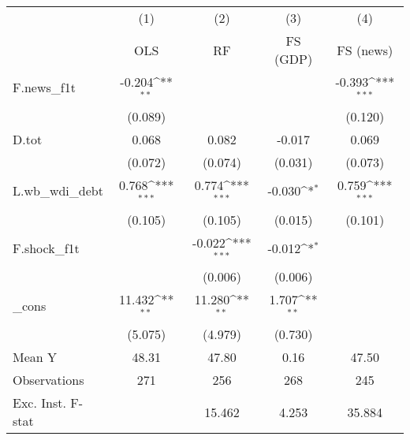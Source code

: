 {
\def\sym#1{\ifmmode^{#1}\else\(^{#1}\)\fi}
\begin{tabular}{l*{4}{c}}
\toprule
            &\multicolumn{1}{c}{(1)}&\multicolumn{1}{c}{(2)}&\multicolumn{1}{c}{(3)}&\multicolumn{1}{c}{(4)}\\
            &\multicolumn{1}{c}{OLS}&\multicolumn{1}{c}{RF}&\multicolumn{1}{c}{FS (GDP)}&\multicolumn{1}{c}{FS (news)}\\
\midrule
F.news\_f1t  &      -0.204\sym{**} &                     &                     &      -0.393\sym{***}\\
            &     (0.089)         &                     &                     &     (0.120)         \\
\addlinespace
D.tot       &       0.068         &       0.082         &      -0.017         &       0.069         \\
            &     (0.072)         &     (0.074)         &     (0.031)         &     (0.073)         \\
\addlinespace
L.wb\_wdi\_debt&       0.768\sym{***}&       0.774\sym{***}&      -0.030\sym{*}  &       0.759\sym{***}\\
            &     (0.105)         &     (0.105)         &     (0.015)         &     (0.101)         \\
\addlinespace
F.shock\_f1t &                     &      -0.022\sym{***}&      -0.012\sym{*}  &                     \\
            &                     &     (0.006)         &     (0.006)         &                     \\
\addlinespace
\_cons      &      11.432\sym{**} &      11.280\sym{**} &       1.707\sym{**} &                     \\
            &     (5.075)         &     (4.979)         &     (0.730)         &                     \\
\midrule
Mean Y      &       48.31         &       47.80         &        0.16         &       47.50         \\
Observations&         271         &         256         &         268         &         245         \\
Exc. Inst. F-stat&                     &      15.462         &       4.253         &      35.884         \\
\bottomrule
\end{tabular}
}
